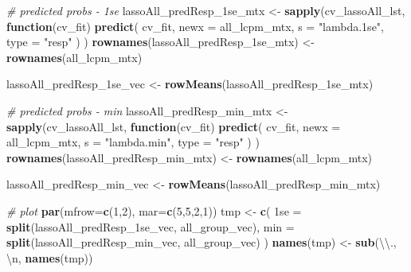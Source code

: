 \documentclass[
]{book}
\newenvironment{Shaded}{\begin{snugshade}}{\end{snugshade}}
\newcommand{\CharTok}[1]{\textcolor[rgb]{0.31,0.60,0.02}{#1}}
\newcommand{\CommentTok}[1]{\textcolor[rgb]{0.56,0.35,0.01}{\textit{#1}}}
\newcommand{\ControlFlowTok}[1]{\textcolor[rgb]{0.13,0.29,0.53}{\textbf{#1}}}
\newcommand{\DataTypeTok}[1]{\textcolor[rgb]{0.13,0.29,0.53}{#1}}
\newcommand{\DecValTok}[1]{\textcolor[rgb]{0.00,0.00,0.81}{#1}}
\newcommand{\KeywordTok}[1]{\textcolor[rgb]{0.13,0.29,0.53}{\textbf{#1}}}
\newcommand{\NormalTok}[1]{#1}
\newcommand{\StringTok}[1]{\textcolor[rgb]{0.31,0.60,0.02}{#1}}
\begin{document}
\begin{Shaded}
\begin{Highlighting}[]
\CommentTok{\# predicted probs {-} 1se}
\NormalTok{lassoAll\_predResp\_1se\_mtx <{-}}\StringTok{ }\KeywordTok{sapply}\NormalTok{(cv\_lassoAll\_lst, }\ControlFlowTok{function}\NormalTok{(cv\_fit)}
\KeywordTok{predict}\NormalTok{(}
\NormalTok{ cv\_fit,}
 \DataTypeTok{newx =}\NormalTok{ all\_lcpm\_mtx,}
 \DataTypeTok{s =} \StringTok{"lambda.1se"}\NormalTok{,}
 \DataTypeTok{type =} \StringTok{"resp"}
\NormalTok{ )}
\NormalTok{)}
\KeywordTok{rownames}\NormalTok{(lassoAll\_predResp\_1se\_mtx) <{-}}\StringTok{ }\KeywordTok{rownames}\NormalTok{(all\_lcpm\_mtx)}

\NormalTok{lassoAll\_predResp\_1se\_vec <{-}}\StringTok{ }\KeywordTok{rowMeans}\NormalTok{(lassoAll\_predResp\_1se\_mtx)}

\CommentTok{\# predicted probs {-} min}
\NormalTok{lassoAll\_predResp\_min\_mtx <{-}}\StringTok{ }\KeywordTok{sapply}\NormalTok{(cv\_lassoAll\_lst, }\ControlFlowTok{function}\NormalTok{(cv\_fit)}
\KeywordTok{predict}\NormalTok{(}
\NormalTok{ cv\_fit,}
 \DataTypeTok{newx =}\NormalTok{ all\_lcpm\_mtx,}
 \DataTypeTok{s =} \StringTok{"lambda.min"}\NormalTok{,}
 \DataTypeTok{type =} \StringTok{"resp"}
\NormalTok{ )}
\NormalTok{)}
\KeywordTok{rownames}\NormalTok{(lassoAll\_predResp\_min\_mtx) <{-}}\StringTok{ }\KeywordTok{rownames}\NormalTok{(all\_lcpm\_mtx)}

\NormalTok{lassoAll\_predResp\_min\_vec <{-}}\StringTok{ }\KeywordTok{rowMeans}\NormalTok{(lassoAll\_predResp\_min\_mtx)}

\CommentTok{\# plot}
\KeywordTok{par}\NormalTok{(}\DataTypeTok{mfrow=}\KeywordTok{c}\NormalTok{(}\DecValTok{1}\NormalTok{,}\DecValTok{2}\NormalTok{), }\DataTypeTok{mar=}\KeywordTok{c}\NormalTok{(}\DecValTok{5}\NormalTok{,}\DecValTok{5}\NormalTok{,}\DecValTok{2}\NormalTok{,}\DecValTok{1}\NormalTok{))}
\NormalTok{tmp <{-}}\StringTok{ }\KeywordTok{c}\NormalTok{(}
 \StringTok{\textasciigrave{}}\DataTypeTok{1se}\StringTok{\textasciigrave{}}\NormalTok{ =}\StringTok{ }\KeywordTok{split}\NormalTok{(lassoAll\_predResp\_1se\_vec, all\_group\_vec),}
 \DataTypeTok{min =} \KeywordTok{split}\NormalTok{(lassoAll\_predResp\_min\_vec, all\_group\_vec)}
\NormalTok{)}
\KeywordTok{names}\NormalTok{(tmp) <{-}}\StringTok{ }\KeywordTok{sub}\NormalTok{(}\StringTok{\textquotesingle{}}\CharTok{\textbackslash{}\textbackslash{}}\StringTok{.\textquotesingle{}}\NormalTok{, }\StringTok{\textquotesingle{}}\CharTok{\textbackslash{}n}\StringTok{\textquotesingle{}}\NormalTok{, }\KeywordTok{names}\NormalTok{(tmp))}


\end{Highlighting}
\end{Shaded}
\end{document}
